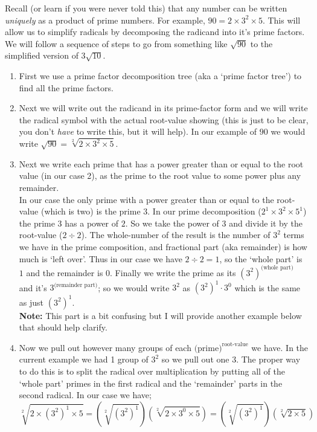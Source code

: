 \documentclass{ximeraXloud}
\begin{document}
    Recall (or learn if you were never told this) that any number can be written \textit{uniquely} as a product of prime numbers. For example, $90 = 2 \times 3^2 \times 5$. This will allow us to simplify radicals by decomposing the radicand into it's prime factors. We will follow a sequence of steps to go from something like $\sqrt{90}$ to the simplified version of $3\sqrt{10}$.

    \begin{enumerate}
        \item First we use a prime factor decomposition tree (aka a `prime factor tree') to find all the prime factors.
        \item Next we will write out the radicand in its prime-factor form and we will write the radical symbol with the actual root-value showing (this is just to be clear, you don't \textit{have} to write this, but it will help). In our example of $90$ we would write $\sqrt{90} = \sqrt[2]{2 \times 3^2 \times 5}$.
        \item Next we write each prime that has a power greater than or equal to the root value (in our case 2), as the prime to the root value to some power plus any remainder. \\
        In our case the only prime with a power greater than or equal to the root-value (which is two) is the prime $3$. In our prime decomposition ($2^1 \times 3^2 \times 5^1$) the prime $3$ has a power of $2$. So we take the power of $3$ and divide it by the root-value ($2 \div 2$). The whole-number of the result is the number of $3^2$ terms we have in the prime composition, and fractional part (aka remainder) is how much is `left over'. Thus in our case we have $2 \div 2 = 1$, so the `whole part' is $1$ and the remainder is $0$. Finally we write the prime as its $(3^2)^{\text{(whole part)}}$ and it's $3^{\text{(remainder part)}}$; so we would write $3^2$ as $(3^2)^1 \cdot 3^0$ which is the same as just $(3^2)^1$.\\
        \textbf{Note:} This part is a bit confusing but I will provide another example below that should help clarify.
        \item Now we pull out however many groups of each $\text{(prime)}^{\text{root-value}}$ we have. In the current example we had 1 group of $3^2$ so we pull out one $3$. The proper way to do this is to split the radical over multiplication by putting all of the `whole part' primes in the first radical and the `remainder' parts in the second radical. In our case we have;
        \[
            \sqrt[2]{2 \times (3^2)^1 \times 5} = \left(\sqrt[2]{(3^2)^1}\right)\left(\sqrt[2]{2\times 3^0 \times 5}\right)  = \left(\sqrt[2]{(3^2)^1}\right)\left(\sqrt[2]{2\times 5}\right)
\]
\end{enumerate}
\end{document}
